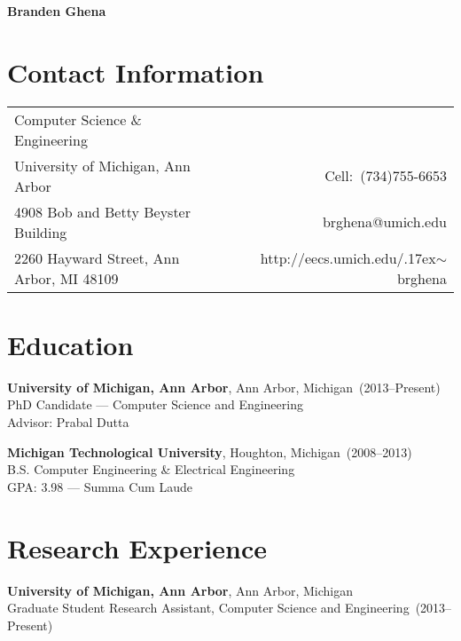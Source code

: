 \documentclass{article}
\begin{document}

\nocite{*}

\begin{center}
    \Huge{\bf{Branden Ghena}}
\end{center}

\section*{Contact Information}

\begin{table}[H]
\centering
\vspace*{-16pt}
\begin{tabularx}{\linewidth}{@{} X r @{}}
    {Computer Science \& Engineering}     & {} \\
    {University of Michigan, Ann Arbor}   & {Cell:~(734)755-6653} \\
    {4908 Bob and Betty Beyster Building} & {brghena@umich.edu} \\
    {2260 Hayward Street, Ann Arbor, MI 48109} & {http://eecs.umich.edu/{\raise.17ex\hbox{$\scriptstyle\sim$}}brghena} \\
\end{tabularx}
\end{table}


\section*{Education}
\vspace{-6pt}

{\bf University of Michigan, Ann Arbor}, Ann Arbor, Michigan~(2013--Present) \\
PhD Candidate --- Computer Science and Engineering \\
Advisor: Prabal Dutta

{\bf Michigan Technological University}, Houghton, Michigan~(2008--2013) \\
B.S. Computer Engineering \& Electrical Engineering \\
GPA: 3.98 --- Summa Cum Laude


\section*{Research Experience}
\vspace{-6pt}

{\bf University of Michigan, Ann Arbor}, Ann Arbor, Michigan \\
Graduate Student Research Assistant, Computer Science and Engineering~(2013--Present)
\end{document}
